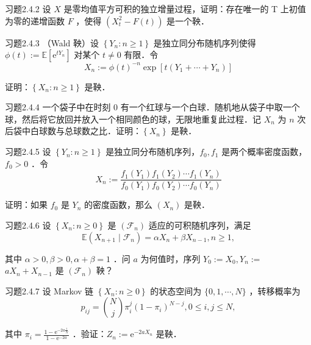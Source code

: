 \begin{namedthm}{习题2.4.2}
    设 $X$ 是零均值平方可积的独立增量过程，证明：存在唯一的 T 上初值为零的递增函数 $F$ ，使得 $\left(X_{t}^{2}-F(t)\right)$ 是一个鞅．
\end{namedthm}

\begin{namedthm}{习题2.4.3}
    （Wald 鞅）设 $\left\{Y_{n}: n \geq 1\right\}$ 是独立同分布随机序列使得 $\phi(t):=\mathbb{E}\left[\mathrm{e}^{t Y_{n}}\right]$ 对某个 $t \neq 0$ 有限．令
$$
X_{n}:=\phi(t)^{-n} \exp \left[t\left(Y_{1}+\cdots+Y_{n}\right)\right]
$$

证明：$\left\{X_{n}: n \geq 1\right\}$ 是鞅．
\end{namedthm}

\begin{namedthm}{习题2.4.4}
    一个袋子中在时刻 0 有一个红球与一个白球．随机地从袋子中取一个球，然后将它放回并放入一个相同颜色的球，无限地重复此过程．记 $X_{n}$ 为 $n$ 次后袋中白球数与总球数之比．证明：$\left\{X_{n}\right\}$ 是鞅．

\end{namedthm}

\begin{namedthm}{习题2.4.5}
    设 $\left\{Y_{n}: n \geq 1\right\}$ 是独立同分布随机序列，$f_{0}, f_{1}$ 是两个概率密度函数，$f_{0}>0$ ．令
$$
X_{n}:=\frac{f_{1}\left(Y_{1}\right) f_{1}\left(Y_{2}\right) \cdots f_{1}\left(Y_{n}\right)}{f_{0}\left(Y_{1}\right) f_{0}\left(Y_{2}\right) \cdots f_{0}\left(Y_{n}\right)}
$$

证明：如果 $f_{0}$ 是 $Y_{n}$ 的密度函数，那么 $\left(X_{n}\right)$ 是鞅．
\end{namedthm}

\begin{namedthm}{习题2.4.6}
    设 $\left\{X_{n}: n \geq 0\right\}$ 是 $\left(\mathscr{F}_{n}\right)$ 适应的可积随机序列，满足
$$
\mathbb{E}\left(X_{n+1} \mid \mathscr{F}_{n}\right)=\alpha X_{n}+\beta X_{n-1}, n \geq 1,
$$

其中 $\alpha>0, \beta>0, \alpha+\beta=1$ ．问 $a$ 为何值时，序列 $Y_{0}:=X_{0}, Y_{n}:=$ $a X_{n}+X_{n-1}$ 是 $\left(\mathscr{F}_{n}\right)$ 鞅？
\end{namedthm}

\begin{namedthm}{习题2.4.7}
    设 Markov 链 $\left\{X_{n}: n \geq 0\right\}$ 的状态空间为 $\{0,1, \cdots, N\}$ ，转移概率为
$$
p_{i j}=\binom{N}{j} \pi_{i}^{j}\left(1-\pi_{i}\right)^{N-j}, 0 \leq i, j \leq N,
$$

其中 $\pi_{i}=\frac{1-\mathrm{e}^{-2 a \frac{i}{N}}}{1-\mathrm{e}^{-2 a}}$ ．验证：$Z_{n}:=\mathrm{e}^{-2 a X_{n}}$ 是鞅．
\end{namedthm}

